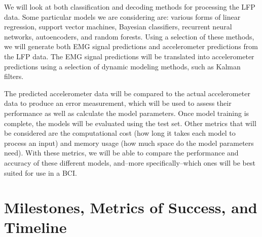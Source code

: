 \documentclass[12pt]{article}
\begin{document}
We will look at both classification and decoding methods for processing the LFP data. Some particular models we are considering are: various forms of linear regression, support vector machines, Bayesian classifiers, recurrent neural networks, autoencoders, and random forests. Using a selection of these methods, we will generate both EMG signal predictions and accelerometer predictions from the LFP data. The EMG signal predictions will be translated into accelerometer predictions using a selection of dynamic modeling methods, such as Kalman filters.

The predicted accelerometer data will be compared to the actual accelerometer data to produce an error measurement, which will be used to assess their performance as well as calculate the model parameters. Once model training is complete, the models will be evaluated using the test set. Other metrics that will be considered are the computational cost (how long it takes each model to process an input) and memory usage (how much space do the model parameters need). With these metrics, we will be able to compare the performance and accuracy of these different models, and--more specifically--which ones will be best suited for use in a BCI.

\section{Milestones, Metrics of Success, and Timeline}
\end{document}
